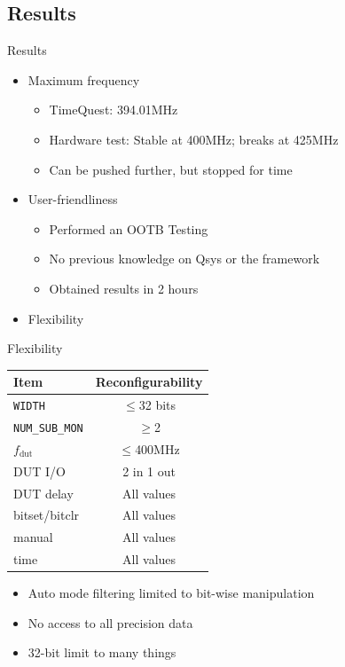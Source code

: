 \documentclass[t]{beamer}
\begin{document}
\subsection{Results}
\begin{frame}{Results}
\begin{itemize}
  \item<+-> Maximum frequency
  \begin{itemize}
    \item TimeQuest: 394.01MHz
    \item Hardware test: Stable at 400MHz; breaks at 425MHz
    \item Can be pushed further, but stopped for time
  \end{itemize}
  \item<+-> User-friendliness
  \begin{itemize}
    \item Performed an OOTB Testing
    \item No previous knowledge on Qsys or the framework
    \item Obtained results in 2 hours
  \end{itemize}
  \item<+-> Flexibility
\end{itemize}
\end{frame}

\begin{frame}{Flexibility}
  \begin{table}[H]
    \centering
    \begin{tabular}{|l|c|}
      \hline
      Item                  & Reconfigurability \\
      \hline
      \texttt{WIDTH}        & $\le$32 bits \\
      \texttt{NUM\_SUB\_MON}& $\ge$2       \\
      $f_{\text{dut}}$      & $\le$400MHz  \\
      DUT I/O               & 2 in 1 out   \\
      DUT delay             & All values   \\
      bitset/bitclr         & All values   \\
      manual                & All values   \\
      time                  & All values   \\
      \hline
    \end{tabular}
  \end{table}
  \begin{itemize}
    \item Auto mode filtering limited to bit-wise manipulation
    \item No access to all precision data
    \item 32-bit limit to many things
  \end{itemize}
\end{frame}
\end{document}
